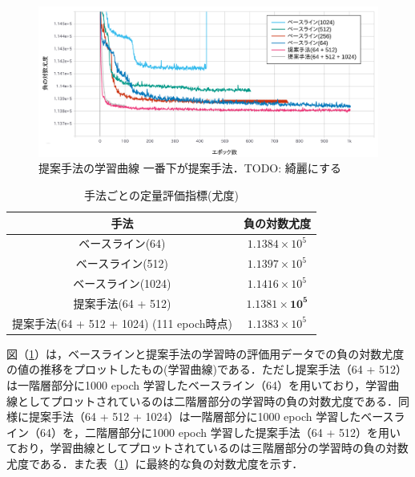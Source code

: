 \begin{figure}[tp]
    \begin{center}
        \includegraphics[width=\linewidth]{./figures/curve.png}
        \caption[提案手法の学習曲線]{提案手法の学習曲線 一番下が提案手法．TODO: 綺麗にする}
        \label{fig:curve}
    \end{center}
    \end{figure}

\begin{table}[tbp]
    \begin{center}
    \caption{手法ごとの定量評価指標(尤度)}
    \begin{tabular}{|c||c|} \hline
      手法 & 負の対数尤度 \\ \hline \hline
      ベースライン(64) & $1.1384 \times 10^5 $ \\ \hline
      ベースライン(512) & $1.1397 \times 10^5 $ \\ \hline
      ベースライン(1024) & $1.1416 \times 10^5 $ \\ \hline
      提案手法(64 + 512) & $\bm{1.1381 \times 10^5 }$ \\ \hline
      提案手法(64 + 512 + 1024) (111 epoch時点)& $1.1383 \times 10^5$ \\ \hline
    \end{tabular}
    \label{table:evaluation}
    \end{center}
  \end{table}
  

図（\ref{fig:curve}）は，ベースラインと提案手法の学習時の評価用データでの負の対数尤度の値の推移をプロットしたもの(学習曲線)である．ただし提案手法（64 + 512）は一階層部分に1000 epoch 学習したベースライン（64）を用いており，学習曲線としてプロットされているのは二階層部分の学習時の負の対数尤度である．同様に提案手法（64 + 512 + 1024）は一階層部分に1000 epoch 学習したベースライン（64）を，二階層部分に1000 epoch 学習した提案手法（64 + 512）を用いており，学習曲線としてプロットされているのは三階層部分の学習時の負の対数尤度である．また表（\ref{table:evaluation}）に最終的な負の対数尤度を示す．

